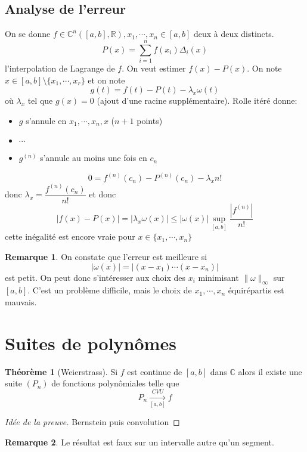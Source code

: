 \documentclass{article}
\theoremstyle{definition}
\newtheorem*{thm}{Théorème}
\newtheorem*{rem}{Remarque}
\begin{document}
\subsection{Analyse de l'erreur}

On se donne $f\in\mathbb C^n([a, b], \mathbb R) ,x_1, \cdots, x_n\in [a, b]$ deux à deux distincts. \[
    P(x)=\sum_{i=1}^nf (x_i)\Delta_i(x)
\]
l'interpolation de Lagrange de $f$. On veut estimer $f(x)-P(x)$. On note $x\in [a, b]\setminus\{x_1, \cdots, x_r\}$ et on note \[
    g(t)=f(t)-P(t)-\lambda_x\omega(t)
\]
où $\lambda_x$ tel que $g(x)=0$ (ajout d'une racine supplémentaire). Rolle itéré donne:

\begin{itemize}
    \item 
$g$ s'annule en $x_1, \cdots, x_n, x$ ($n+1$ points)
\item $\cdots$
\item 
$g^{(n)}$ s'annule au moins une fois en $c_n$
\end{itemize}

\[
    0=f^{(n)}(c_n)-P^{(n)}(c_n)-\lambda_x n!
\]
donc $\lambda_x = \dfrac{f^{(n)}(c_n)}{n!}$ et donc \[
    |f(x)-P(x)|=|\lambda_x\omega (x)|\leq |\omega(x)|\sup_{[a, b]}\frac{|f^{(n)}|}{n!}
\]
cette inégalité est encore vraie pour $x\in\{x_1, \cdots, x_n\}$

\begin{rem}
On constate que l'erreur est meilleure si \[
    |\omega(x)|=|(x-x_1)\cdots (x-x_n)|
\]
est petit. On peut donc s'intéresser aux choix des $x_i$ minimisant $\|\omega\|_\infty$ sur $[a, b]$. C'est un problème difficile, mais le choix de $x_1, \cdots, x_n$ équirépartis est mauvais.
\end{rem}

\section{Suites de polynômes}

\begin{thm}[Weierstrass]
    Si $f$ est continue de $[a, b]$ dans $\mathbb C$ alors il existe une suite $(P_n)$ de fonctions polynômiales telle que \[
        P_n\xrightarrow[{[a, b]}]{CVU} f
    \]
\end{thm}

\begin{proof}[Idée de la preuve]
    Bernstein puis convolution
\end{proof}

\begin{rem}
Le résultat est faux sur un intervalle autre qu'un segment.
\end{rem}
\end{document}
